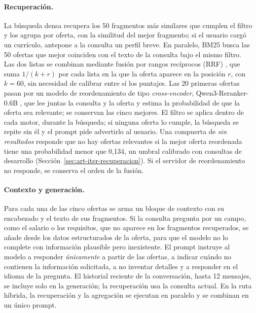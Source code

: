 \paragraph{Recuperación.}
\label{sec:art-recuperacion}
La búsqueda densa recupera los 50 fragmentos más similares que cumplen el filtro y los agrupa por oferta, con la similitud del mejor fragmento; si el usuario cargó un currículo, antepone a la consulta un perfil breve. En paralelo, BM25 \citep{Robertson2009} busca las 50 ofertas que mejor coinciden con el texto de la consulta bajo el mismo filtro. Las dos listas se combinan mediante fusión por rangos recíprocos (RRF) \citep{Cormack2009}, que suma $1/(k + r)$ por cada lista en la que la oferta aparece en la posición $r$, con $k = 60$, sin necesidad de calibrar entre sí los puntajes. Las 20 primeras ofertas pasan por un modelo de reordenamiento de tipo \textit{cross-encoder}, Qwen3-Reranker-0.6B \citep{Zhang2025Qwen3}, que lee juntas la consulta y la oferta \citep{Nogueira2019} y estima la probabilidad de que la oferta sea relevante; se conservan las cinco mejores. El filtro se aplica dentro de cada motor, durante la búsqueda; si ninguna oferta lo cumple, la búsqueda se repite sin él y el prompt pide advertirlo al usuario. Una compuerta de \emph{sin resultados} responde que no hay ofertas relevantes si la mejor oferta reordenada tiene una probabilidad menor que 0,134, un umbral calibrado con consultas de desarrollo (Sección~\ref{sec:art-iter-recuperacion}). Si el servidor de reordenamiento no responde, se conserva el orden de la fusión.

\paragraph{Contexto y generación.}
Para cada una de las cinco ofertas se arma un bloque de contexto con su encabezado y el texto de sus fragmentos. Si la consulta pregunta por un campo, como el salario o los requisitos, que no aparece en los fragmentos recuperados, se añade desde los datos estructurados de la oferta, para que el modelo no lo complete con información plausible pero inexistente. El prompt instruye al modelo a responder \emph{únicamente} a partir de las ofertas, a indicar cuándo no contienen la información solicitada, a no inventar detalles y a responder en el idioma de la pregunta. El historial reciente de la conversación, hasta 12 mensajes, se incluye solo en la generación; la recuperación usa la consulta actual. En la ruta híbrida, la recuperación y la agregación se ejecutan en paralelo y se combinan en un único prompt.

